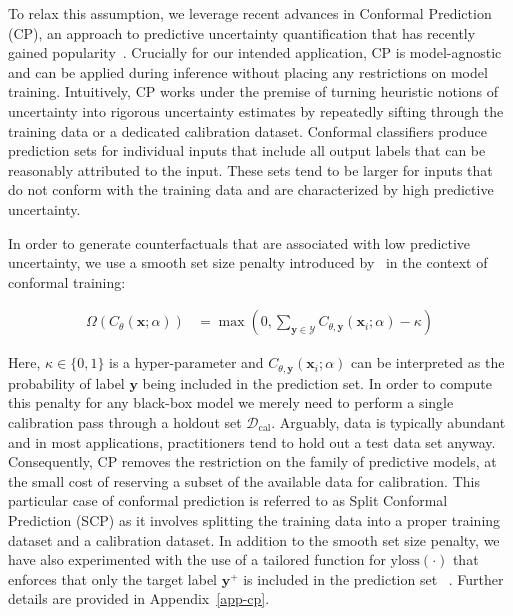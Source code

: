 \documentclass{article}
\begin{document}
To relax this assumption, we leverage recent advances in Conformal Prediction (CP), an approach to predictive uncertainty quantification that has recently gained popularity~\citep{angelopoulos2021gentle,manokhin2022awesome}. Crucially for our intended application, CP is model-agnostic and can be applied during inference without placing any restrictions on model training. Intuitively, CP works under the premise of turning heuristic notions of uncertainty into rigorous uncertainty estimates by repeatedly sifting through the training data or a dedicated calibration dataset. Conformal classifiers produce prediction sets for individual inputs that include all output labels that can be reasonably attributed to the input. These sets tend to be larger for inputs that do not conform with the training data and are characterized by high predictive uncertainty. 

In order to generate counterfactuals that are associated with low predictive uncertainty, we use a smooth set size penalty introduced by~\citet{stutz2022learning} in the context of conformal training:

\begin{equation}\label{eq:setsize}
  \begin{aligned}
    \Omega(C_{\theta}(\mathbf{x};\alpha))&=\max \left(0, \sum_{\mathbf{y}\in\mathcal{Y}}C_{\theta,\mathbf{y}}(\mathbf{x}_i;\alpha) - \kappa \right)
  \end{aligned}
\end{equation}

Here, $\kappa \in \{0,1\}$ is a hyper-parameter and $C_{\theta,\mathbf{y}}(\mathbf{x}_i;\alpha)$ can be interpreted as the probability of label $\mathbf{y}$ being included in the prediction set. In order to compute this penalty for any black-box model we merely need to perform a single calibration pass through a holdout set $\mathcal{D}_{\text{cal}}$. Arguably, data is typically abundant and in most applications, practitioners tend to hold out a test data set anyway. Consequently, CP removes the restriction on the family of predictive models, at the small cost of reserving a subset of the available data for calibration. This particular case of conformal prediction is referred to as Split Conformal Prediction (SCP) as it involves splitting the training data into a proper training dataset and a calibration dataset. In addition to the smooth set size penalty, we have also experimented with the use of a tailored function for $\text{yloss}(\cdot)$ that enforces that only the target label $\mathbf{y}^+$ is included in the prediction set ~\citet{stutz2022learning}. Further details are provided in Appendix~\ref{app-cp}.
\end{document}
